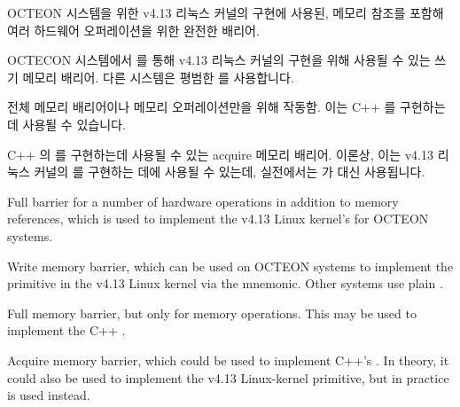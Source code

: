 \begin{description}[style=nextline]
\item[\tco{SYNC}]
	OCTEON 시스템을 위한 v4.13 리눅스 커널의  구현에 사용된,
	메모리 참조를 포함해 여러 하드웨어 오퍼레이션을 위한 완전한 배리어.
\item[\tco{SYNC_WMB}]
	OCTECON 시스템에서  를 통해 v4.13 리눅스 커널의
	 구현을 위해 사용될 수 있는 쓰기 메모리 배리어.
	다른 시스템은 평범한  를 사용합니다.
\item[\tco{SYNC_MB}]
	전체 메모리 배리어이나 메모리 오퍼레이션만을 위해 작동함.
	이는 C++  를 구현하는데
	사용될 수 있습니다.
\item[\tco{SYNC_ACQUIRE}]
	C++ 의  를 구현하는데
	사용될 수 있는 acquire 메모리 배리어.
	이론상, 이는 v4.13 리눅스 커널의  를 구현하는
	데에 사용될 수 있는데, 실전에서는  가 대신 사용됩니다.

\iffalse

\item[\tco{SYNC}]
	Full barrier for a number of hardware operations in addition
	to memory references, which is used to implement the v4.13
	Linux kernel's  for OCTEON systems.
\item[\tco{SYNC_WMB}]
	Write memory barrier, which can be used on OCTEON systems
	to implement the
	 primitive in the v4.13 Linux kernel via the
	 mnemonic.
	Other systems use plain .
\item[\tco{SYNC_MB}]
	Full memory barrier, but only for memory operations.
	This may be used to implement the
	C++ .
\item[\tco{SYNC_ACQUIRE}]
	Acquire memory barrier, which could be used to implement
	C++'s .
	In theory, it could also be used to implement the v4.13 Linux-kernel
	 primitive, but in practice
	 is used instead.


\end{description}
